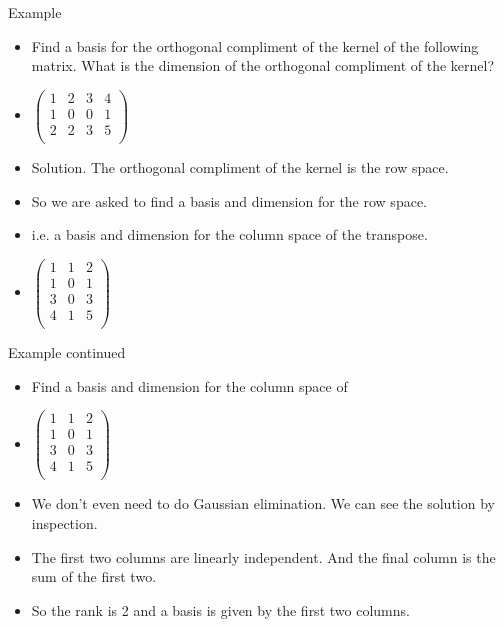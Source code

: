 \documentclass{beamer}
\begin{document}
\begin{frame}{Example}
\begin{itemize}
\item Find a basis for the orthogonal compliment of the
kernel of the following matrix. What is the dimension of the orthogonal
compliment of the kernel?
\item $\begin{pmatrix}
1 & 2 & 3 & 4 \\
1 & 0 & 0 & 1 \\
2 & 2 & 3 & 5 \\
\end{pmatrix}
$
\item Solution. The orthogonal compliment of the kernel is the row space.
\item So we are asked to find a basis and dimension for the row space.
\item i.e. a basis and dimension for the column space of the transpose.
\item $\begin{pmatrix}
1 & 1 & 2 \\
1 & 0 & 1 \\
3 & 0 & 3 \\
4 & 1 & 5 \\
\end{pmatrix}
$
\end{itemize}
\end{frame}

\begin{frame}{Example continued}
\begin{itemize}
\item Find a basis and dimension for the column space of
\item $\begin{pmatrix}
1 & 1 & 2 \\
1 & 0 & 1 \\
3 & 0 & 3 \\
4 & 1 & 5 \\
\end{pmatrix}
$
\item We don't even need to do Gaussian elimination. We can see the solution by inspection.
\item The first two columns are linearly independent. And the final column is the sum of the first two.
\item So the rank is 2 and a basis is given by the first two columns.
\end{itemize}
\end{frame}

\end{document}
